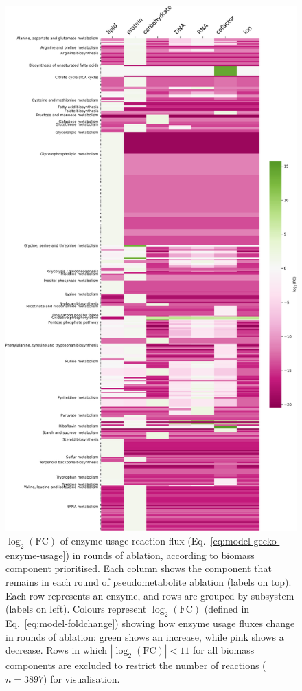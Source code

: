 \begin{figure}
  \centering
  \includegraphics[width=.8\linewidth]{allocation_fc}
  \caption[
    $\log_{2}(\mathrm{FC})$ of enzyme usage reaction flux in rounds of ablation
  ]{
    $\log_{2}(\mathrm{FC})$ of enzyme usage reaction flux (Eq.\ \ref{eq:model-gecko-enzyme-usage}) in rounds of ablation, according to biomass component prioritised.
    Each column shows the component that remains in each round of pseudometabolite ablation (labels on top).
    Each row represents an enzyme, and rows are grouped by subsystem (labels on left).
    Colours represent $\log_{2}(\mathrm{FC})$ (defined in Eq.\ \ref{eq:model-foldchange}) showing how enzyme usage fluxes change in rounds of ablation: green shows an increase, while pink shows a decrease.
    Rows in which $|\log_{2}(\mathrm{FC})| < 11$ for all biomass components are excluded to restrict the number of reactions ($n = \num{3897}$) for visualisation.
  }
  \label{fig:model-ablate-enz-use}
\end{figure}

